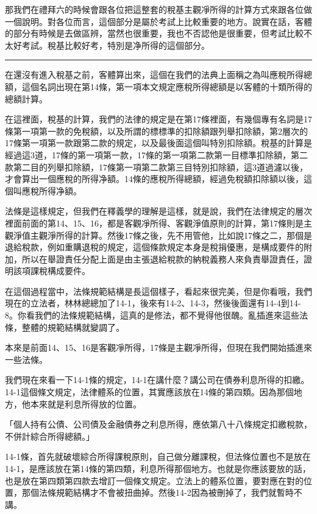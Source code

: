 \documentclass[oneside,sub3section]{ctexbook}
\begin{document}
那我們在禮拜六的時候會跟各位把這整套的稅基主觀凈所得的計算方式來跟各位做一個說明。對各位而言，這個部分是屬於考試上比較重要的地方。說實在話，客體的部分有時候是去做區辨，當然也很重要，我也不否認他是很重要，但考試比較不太好考試。稅基比較好考，特別是净所得的這個部分。

\begin{center}\rule{0.5\linewidth}{0.5pt}\end{center}

在還沒有進入稅基之前，客體算出來，這個在我們的法典上面稱之為叫應稅所得總額，這個名詞出現在第14條，第一項本文規定應稅所得總額是以客體的十類所得的總額計算。

在這裡面，稅基的計算，我們的法律的規定是在第17條裡面，有幾個專有名詞是17條第一項第一款的免稅額，以及所謂的標標準的扣除額跟列舉扣除額，第2層次的17條第一項第一款跟第二款的規定，以及最後面這個叫特別扣除額。稅基的計算是經過這3道，17條的第一項第一款，17條的第一項第二款第一目標準扣除額，第二款第二目的列舉扣除額，17條第一項第二款第三目特別扣除額，這3道過濾以後，才會算出一個應稅的所得净額。14條的應稅所得總額，經過免稅額扣除額以後，這個叫應稅所得净額。

法條是這樣規定，但我們在釋義學的理解是這樣，就是說，我們在法律規定的層次裡面前面的第14、15、16，都是客觀凈所得、客觀淨值原則的計算，第17條則是主觀淨值主觀淨所得的計算。然後17條之後，先不用管他，比如說17條之二，那個是退給稅款，例如重購退稅的規定，這個條款規定本身是稅捐優惠，是構成要件的附加，所以在舉證責任分配上面是由主張退給稅款的納稅義務人來負責舉證責任，證明該項課稅構成要件。

在這個過程當中，法條規範結構是長這個樣子，看起來很完美，但是你看哦，我們現在的立法者，林林總總加了14-1，後來有14-2、14-3，然後後面還有14-4到14-8。你看我們的法條規範結構，這真的是修法，都不覺得他很醜。亂插進來這些法條，整體的規範結構就變調了。

本來是前面14、15、16是客觀凈所得，17條是主觀凈所得，但現在我們開始插進來一些法條。

我們現在來看一下14-1條的規定，14-1在講什麼？講公司在債券利息所得的扣繳。14-1這個條文規定，法律體系的位置，其實應該放在14條的第四類。因為那個地方，他本來就是利息所得放的位置。

「個人持有公債、公司債及金融債券之利息所得，應依第八十八條規定扣繳稅款，不併計綜合所得總額。」

14-1條，首先就破壞綜合所得課稅原則，自己做分離課稅，但法條位置也不是放在14-1，是應該放在第14條的第四類，利息所得那個地方。也就是你應該要放的話，也是放在第四類第四款去增訂一個條文規定。立法上的體系位置，要對應在對的位置，那個法條規範結構才不會被扭曲掉。然後14-2因為被刪掉了，我們就暫時不講。
\end{document}
